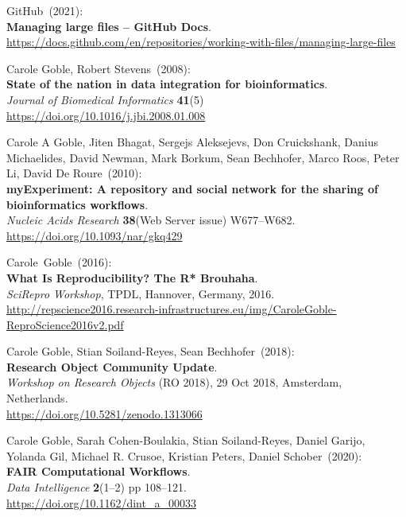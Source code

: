 \begin{thebibliography}{9}
GitHub~(2021): \\
\textbf{Managing large files -- GitHub Docs}.\\
\url{https://docs.github.com/en/repositories/working-with-files/managing-large-files}

Carole Goble, Robert Stevens~(2008): \\
\textbf{State of the nation in data integration for bioinformatics}.\\
\emph{Journal of Biomedical Informatics} \textbf{41}(5) \\
\url{https://doi.org/10.1016/j.jbi.2008.01.008}

Carole A Goble, Jiten Bhagat, Sergejs Aleksejevs, Don Cruickshank, Danius Michaelides, David Newman, Mark Borkum, Sean Bechhofer, Marco Roos, Peter Li, David De Roure~(2010): \\
\textbf{myExperiment: A repository and social network for the sharing of bioinformatics workflows}.\\
\emph{Nucleic Acids Research} \textbf{38}(Web Server issue)
W677--W682.\\
\url{https://doi.org/10.1093/nar/gkq429}

Carole~Goble~(2016): \\
\textbf{What Is Reproducibility? The R* Brouhaha}.\\
\emph{SciRepro Workshop}, TPDL, Hannover, Germany, 2016.\\
\url{http://repscience2016.research-infrastructures.eu/img/CaroleGoble-ReproScience2016v2.pdf}

Carole Goble, Stian Soiland-Reyes, Sean Bechhofer~(2018): \\
\textbf{Research Object Community Update}.\\
\emph{Workshop on Research Objects} (RO 2018), 29 Oct 2018, Amsterdam, Netherlands.\\
\url{https://doi.org/10.5281/zenodo.1313066}

Carole Goble, Sarah Cohen-Boulakia, Stian Soiland-Reyes, Daniel Garijo, Yolanda Gil, Michael R. Crusoe, Kristian Peters, Daniel Schober~(2020): \\
\textbf{FAIR Computational Workflows}.\\
\emph{Data Intelligence} \textbf{2}(1--2) pp 108--121.\\
\url{https://doi.org/10.1162/dint_a_00033}


\end{thebibliography}
